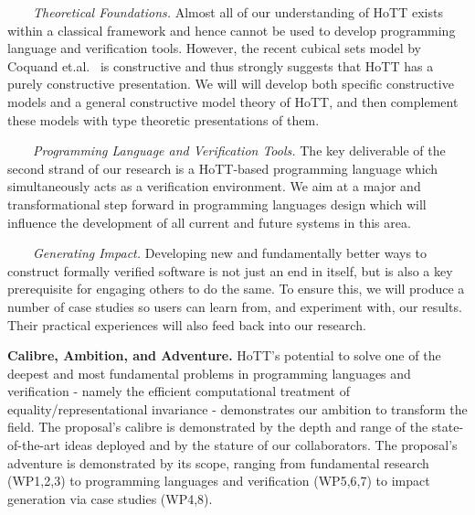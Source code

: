 \documentclass[a4paper,11pt]{article}
\begin{document}



$\;\;\; \;\;\;$ {\em Theoretical Foundations.} Almost all of our
understanding of HoTT exists within a classical framework and hence
cannot be used to develop programming language and verification
tools. However, the recent cubical sets model by Coquand
et.al.~\cite{BezemM:cubsmt} is constructive and thus strongly suggests
that HoTT has a
purely constructive presentation. We will will develop
both specific constructive models and a general constructive model
theory of HoTT, and then complement these models with type theoretic
presentations of them.

$\;\;\;\;\;\;$ {\em Programming Language and Verification Tools.} The key
  deliverable of the second strand of our research is a HoTT-based
  programming language which simultaneously acts as a verification
  environment. We aim at a major
  and transformational step forward in programming languages design
  which will influence
  the development of all current and future systems in this area.

$\;\;\;\;\;\;$ {\em Generating Impact.} Developing new and fundamentally
  better ways to construct formally verified software is not just an
  end in itself, but is also a key prerequisite for engaging others to
  do the same.  To ensure this, we will produce a number of case studies so
  users can learn from, and experiment with, our results. Their
  practical experiences will also feed back into our research.

  {\bf Calibre, Ambition, and Adventure.} HoTT's potential to
  solve one of the deepest and most fundamental problems in
  programming languages and verification - namely the efficient
  computational treatment of equality/representational invariance -
  demonstrates our ambition to transform the field. The proposal's calibre is demonstrated by
  the depth and range of the state-of-the-art ideas deployed and by the
  stature of our collaborators. The
  proposal's adventure is demonstrated by its scope, ranging from
  fundamental research (WP1,2,3) to programming languages and
  verification (WP5,6,7) to impact generation via case studies
  (WP4,8).
\end{document}
